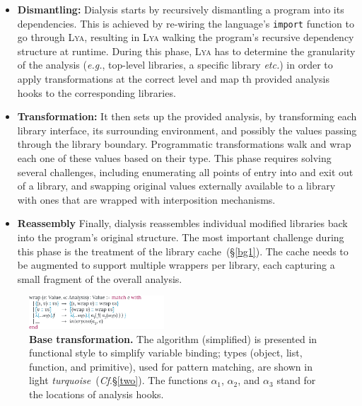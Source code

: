 \documentclass[letterpaper,twocolumn,10pt]{article}
\def\eg{{\em e.g.}, }
\def\etc{{\em etc.}\xspace}
\newcommand{\ttt}[1]{\texttt{#1}}
\newcommand{\cf}[1]{(\emph{Cf}.\S\ref{#1})}
\newcommand{\sx}[1]{(\S\ref{#1})}
\newcommand{\sys}{{\scshape Lya}\xspace}
\begin{document}
\begin{itemize}
  
  \item \textbf{Dismantling:}
Dialysis starts by recursively dismantling a program into its dependencies. %
This is achieved by re-wiring the language's \ttt{import} function to go through \sys, resulting in \sys walking the program's recursive dependency structure at runtime.
During this phase, \sys has to determine the granularity of the analysis (\eg top-level libraries, a specific library \etc) in order to apply transformations at the correct level and map th provided analysis hooks to the corresponding libraries.

  \item \textbf{Transformation:}
It then sets up the provided analysis, by transforming each library interface, its surrounding environment, and possibly the values passing through the library boundary.
Programmatic transformations walk and wrap each one of these values based on their type.
This phase requires solving several challenges, including enumerating all points of entry into and exit out of a library, 
and swapping original values externally available to a library with ones that are wrapped with interposition mechanisms.

  \item \textbf{Reassembly}
Finally, dialysis reassembles individual modified libraries back into the program's original structure.
The most important challenge during this phase is the treatment of the library cache~\sx{bg1}.
The cache needs to be augmented to support multiple wrappers per library, each capturing a small fragment of the overall analysis.

\end{itemize}


\begin{figure}[t]
\raggedleft 
\includegraphics[width=0.45\textwidth]{./figs/lya_base.pdf}
\caption{
  \textbf{Base transformation.}
  \textmd{
  The algorithm (simplified) is presented in functional style to simplify variable binding; types (object, list, function, and primitive), used for pattern matching, are shown in light {\color{cdb} \emph{turquoise}}~\cf{two}. The functions $\alpha_1$, $\alpha_2$, and $\alpha_3$ stand for the locations of analysis hooks.
  }
  \vspace{-4mm}
}
\label{fig:base}
\end{figure}
\end{document}
